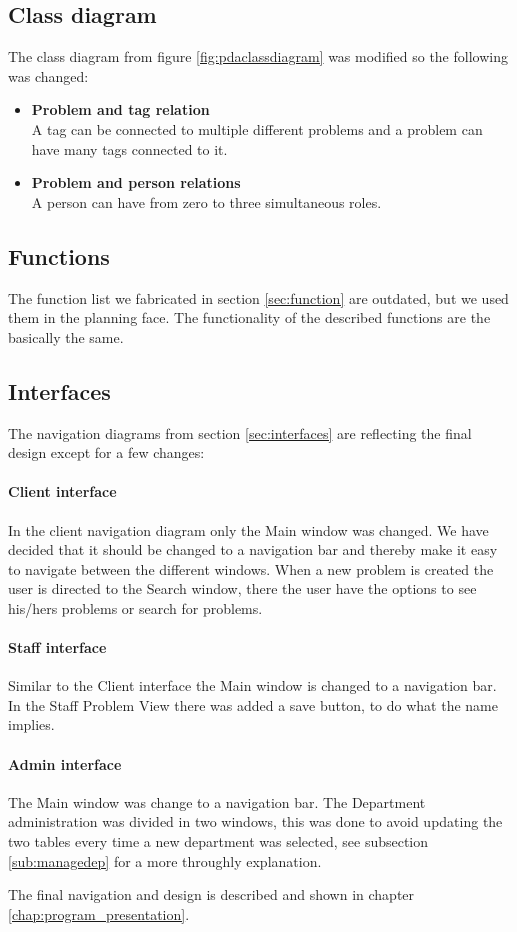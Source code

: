 \subsection{Class diagram}
\label{sub:classdiagram}
The class diagram from figure \ref{fig:pdaclassdiagram} was modified so the following was changed:
\begin{itemize}
\item \textbf{Problem and tag relation} \\
					A tag can be connected to multiple different problems and a problem can have many tags connected to it. 
\item \textbf{Problem and person relations} \\
					A person can have from zero to three simultaneous roles.	
\end{itemize}

\subsection{Functions}
\label{sub:function}
The function list we fabricated in section \ref{sec:function} are outdated, but we used them in the planning face. The functionality of the described functions are the basically the same.  

\subsection{Interfaces}
\label{sub:interface}
The navigation diagrams from section \ref{sec:interfaces} are reflecting the final design except for a few changes:

\paragraph{Client interface}
In the client navigation diagram only the Main window was changed. We have decided that it should be changed to a navigation bar and thereby make it easy to navigate between the different windows. 
When a new problem is created the user is directed to the Search window, there the user have the options to see his/hers problems or search for problems. 

\paragraph{Staff interface}
Similar to the Client interface the Main window is changed to a navigation bar. In the Staff Problem View there was added a save button, to do what the name implies. 

\paragraph{Admin interface}
The Main window was change to a navigation bar. The Department administration was divided in two windows, this was done to avoid updating the two tables every time a new department was selected, see subsection \ref{sub:managedep} for a more throughly explanation.  

The final navigation and design is described and shown in chapter \ref{chap:program_presentation}.

